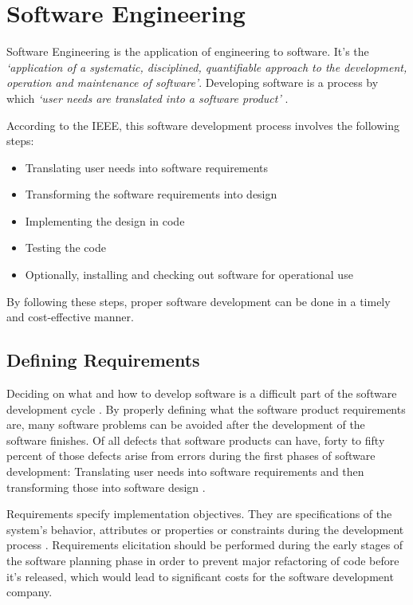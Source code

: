 \section{Software Engineering}\label{state-of-the-art:s:software-engineering}

Software Engineering is the application of engineering to software. It's the \textit{`application of a systematic, disciplined, quantifiable approach to the development, operation and maintenance of software'}. Developing software is a process by which \textit{`user needs are translated into a software product'} \parencite{8016712}.

According to the IEEE, this software development process involves the following steps:

\begin{itemize}

    \item Translating user needs into software requirements
    \item Transforming the software requirements into design
    \item Implementing the design in code
    \item Testing the code
    \item Optionally, installing and checking out software for operational use   
\end{itemize}

By following these steps, proper software development can be done in a timely and cost-effective manner.

\subsection{Defining Requirements}\label{state-of-the-art:ss:defining-requirements}

Deciding on what and how to develop software is a difficult part of the software development cycle \parencite{pacheco_garcía_reyes_2018}.
By properly defining what the software product requirements are, many software problems can be avoided after the development of the software finishes. Of all defects that software products can have, forty to fifty percent of those defects arise from errors during the first phases of software development: Translating user needs into software requirements and then transforming those into software design \Parencite{eugene_wiegers_beatty_2013}. 

Requirements specify implementation objectives. They are specifications of the system's behavior, attributes or properties or constraints during the development process \Parencite{sommerville_sawyer_1997}. Requirements elicitation should be performed during the early stages of the software planning phase in order to prevent major refactoring of code before it's released, which would lead to significant costs for the software development company.

